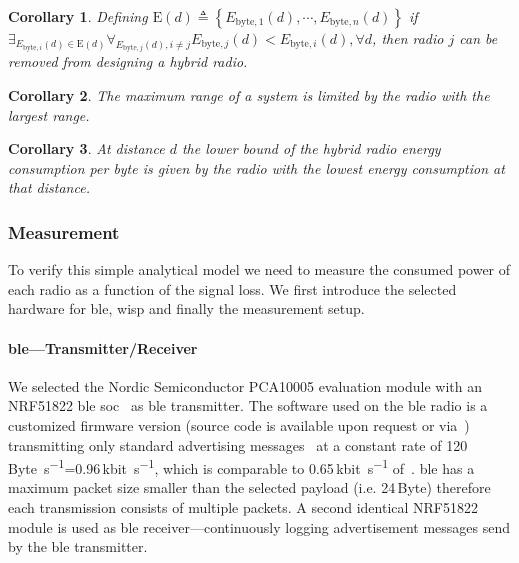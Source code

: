 \documentclass[conference,letterpaper,twoside,final,10pt]{IEEEtran}
\newtheorem{corollary}{Corollary}
\begin{document}
\begin{corollary}
	\label{lemma:excludehigh}
	Defining $\mathrm{E}(d) \triangleq \left\{ E_{\text{byte},1}(d),\cdots, E_{\text{byte},n}(d) \right\}$ if $\exists_{E_{\text{byte},i}(d) \in \mathrm{E}(d)} \forall_{E_{\text{byte},j}(d), i \neq j} E_{\text{byte},j}(d) < E_{\text{byte},i}(d), \forall d$, then radio $j$ can be removed from designing a hybrid radio.
\end{corollary}

\begin{corollary}
	\label{lemma:maxrange}
	The maximum range of a system is limited by the radio with the largest range.
\end{corollary}

\begin{corollary}
	\label{lemma:minenergy}
	At distance $d$ the lower bound of the hybrid radio energy consumption per byte is given by the radio with the lowest energy consumption at that distance.
\end{corollary}

\subsubsection{Measurement}
\label{sec:measurements}

To verify this simple analytical model we need to measure the consumed power of each radio as a function of the signal loss. We first introduce the selected hardware for \ac{ble}, \ac{wisp} and finally the measurement setup.

\paragraph{\acl{ble}---Transmitter/Receiver}
\label{sec:motivation/ble}

We selected the Nordic Semiconductor PCA10005 evaluation module with an NRF51822 \ac{ble} \ac{soc}~\cite{nordic2012nrf51822} as \ac{ble} transmitter.
The software used on the \ac{ble} radio is a customized firmware version (source code is available upon request or via~\cite{blisp2015repo}) transmitting only standard advertising messages~\cite{ble2015standard} at a constant rate of 120\,\si{Byte\per\second}=0.96\,\si{\kilo bit\per\second}, which is comparable to 0.65\,\si{\kilo bit\per\second} of~\cite[Sec. III-B]{dementyev2013rfid}.
\ac{ble} has a maximum packet size smaller than the selected payload (i.e. 24\,\si{Byte}) therefore each transmission consists of multiple packets.
A second identical NRF51822 module is used as \ac{ble} receiver---continuously logging advertisement messages send by the \ac{ble} transmitter.
\end{document}
